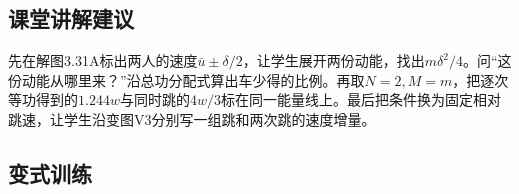 \documentclass[UTF8,fontset=fandol,a4paper,11pt]{ctexart}
\begin{document}
\subsection*{课堂讲解建议}

先在解图3.31A标出两人的速度$\bar u\pm\delta/2$，让学生展开两份动能，找出$m\delta^2/4$。问“这份动能从哪里来？”沿总功分配式算出车少得的比例。再取$N=2,M=m$，把逐次等功得到的$1.244w$与同时跳的$4w/3$标在同一能量线上。最后把条件换为固定相对跳速，让学生沿变图V3分别写一组跳和两次跳的速度增量。



\subsection*{变式训练}
\end{document}
